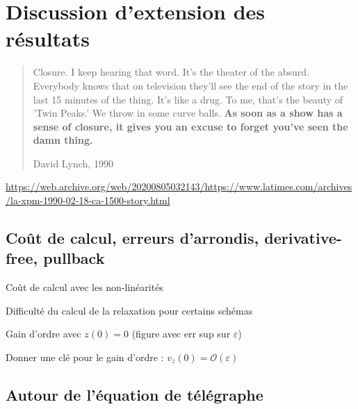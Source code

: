 
\clearemptydoublepage
\chapter{Discussion d'extension des résultats}
\label{chap:discussion}

\begin{quote}
    Closure. I keep hearing that word. It's the theater of the absurd. Everybody knows that on television they'll see the end of the story in the last 15 minutes of the thing. It's like a drug. To me, that's the beauty of 'Twin Peaks.' We throw in some curve balls. \textbf{As soon as a show has a sense of closure, it gives you an excuse to forget you've seen the damn thing.}

    \hfill%
    David Lynch, 1990
\end{quote}
\url{https://web.archive.org/web/20200805032143/https://www.latimes.com/archives/la-xpm-1990-02-18-ca-1500-story.html}

\section{Coût de calcul, erreurs d’arrondis, derivative-free, pullback}

Coût de calcul avec les non-linéarités

Difficulté du calcul de la relaxation pour certains schémas

Gain d’ordre avec $z(0) = 0$ (figure avec err sup sur $\varepsilon$)

Donner une clé pour le gain d’ordre : $v_z(0) = \mathcal{O}(\varepsilon)$


\section{Autour de l’équation de télégraphe}

